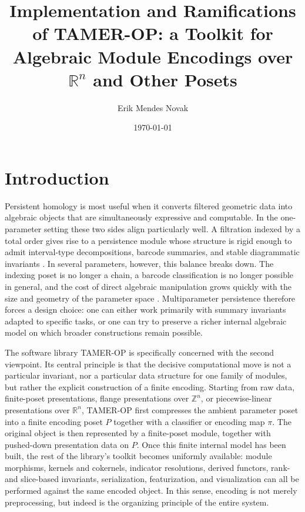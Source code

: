 \documentclass[11pt]{article}
\title{Implementation and Ramifications of TAMER-OP: a Toolkit for Algebraic Module Encodings over $\mathbb{R}^n$ and Other Posets}
\author{Erik Mendes Novak}
\date{\today}
\newcommand{\R}{\mathbb{R}}
\newcommand{\Z}{\mathbb{Z}}
\newcommand{\TAMER}{\textsc{TAMER-OP}}
\theoremstyle{definition}
\theoremstyle{remark}
\begin{document}
\maketitle
\tableofcontents

\newpage

\section{Introduction}\label{sec:introduction}

Persistent homology is most useful when it converts filtered geometric data into algebraic objects that are simultaneously expressive and computable. In the one-parameter setting these two sides align particularly well. A filtration indexed by a total order gives rise to a persistence module whose structure is rigid enough to admit interval-type decompositions, barcode summaries, and stable diagrammatic invariants \cite{ELZ02,CEH07,CB15,EH10}. In several parameters, however, this balance breaks down. The indexing poset is no longer a chain, a barcode classification is no longer possible in general, and the cost of direct algebraic manipulation grows quickly with the size and geometry of the parameter space \cite{CZ09,Les15,CDSGO16,Oud15}. Multiparameter persistence therefore forces a design choice: one can either work primarily with summary invariants adapted to specific tasks, or one can try to preserve a richer internal algebraic model on which broader constructions remain possible.

The software library \TAMER{} is specifically concerned with the second viewpoint. Its central principle is that the decisive computational move is not a particular invariant, nor a particular data structure for one family of modules, but rather the explicit construction of a finite encoding. Starting from raw data, finite-poset presentations, flange presentations over $\Z^n$, or piecewise-linear presentations over $\R^n$, \TAMER{} first compresses the ambient parameter poset into a finite encoding poset $P$ together with a classifier or encoding map $\pi$. The original object is then represented by a finite-poset module, together with pushed-down presentation data on $P$. Once this finite internal model has been built, the rest of the library's toolkit becomes uniformly available: module morphisms, kernels and cokernels, indicator resolutions, derived functors, rank- and slice-based invariants, serialization, featurization, and visualization can all be performed against the same encoded object. In this sense, encoding is not merely preprocessing, but indeed is the organizing principle of the entire system.
\end{document}

